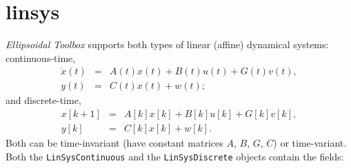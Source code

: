 \section{linsys}
{\it Ellipsoidal Toolbox} supports both types of linear (affine)
dynamical systems: continuous-time,
\begin{eqnarray*}
\dot{x}(t) & = & A(t)x(t) + B(t)u(t) + G(t)v(t),\\
y(t) & = & C(t)x(t) + w(t);
\end{eqnarray*}
and discrete-time,
\begin{eqnarray*}
x[k+1] & = & A[k]x[k] + B[k]u[k] + G[k]v[k], \\
y[k] & = & C[k]x[k] + w[k].
\end{eqnarray*}
Both can be time-invariant (have constant matrices $A$, $B$, $G$, $C$)
or time-variant.
\newline
Both the {\tt LinSysContinuous} and the {\tt LinSysDiscrete} objects contain the fields:
